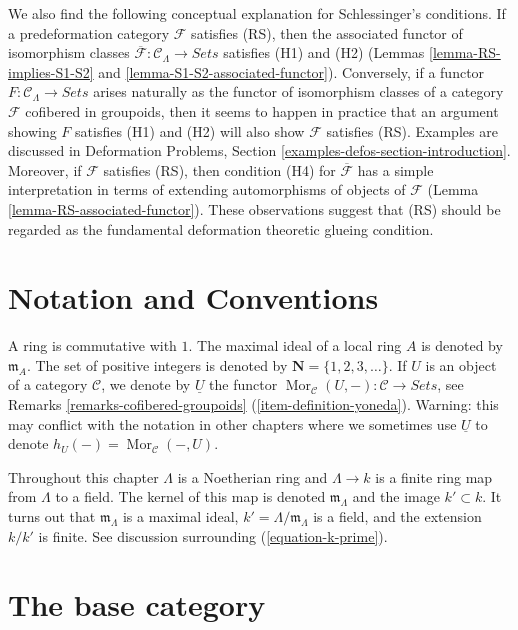 \documentclass{stacks-project}
\theoremstyle{plain}
\theoremstyle{definition}
\theoremstyle{remark}
\numberwithin{equation}{subsection}
\def\Mor{\mathop{\mathrm{Mor}}\nolimits}
\begin{document}
\medskip\noindent
We also find the following conceptual explanation for Schlessinger's
conditions. If a predeformation category $\mathcal{F}$ satisfies (RS),
then the associated functor of isomorphism classes
$\overline{\mathcal{F}}: \mathcal{C}_\Lambda \to \textit{Sets}$
satisfies (H1) and (H2)
(Lemmas \ref{lemma-RS-implies-S1-S2} and
\ref{lemma-S1-S2-associated-functor}).
Conversely, if a functor
$F : \mathcal{C}_\Lambda \to \textit{Sets}$
arises naturally as the functor of isomorphism classes of
a category $\mathcal{F}$ cofibered in groupoids, then it seems to happen in
practice that an argument showing $F$ satisfies (H1) and (H2) will also show
$\mathcal{F}$ satisfies (RS). Examples are discussed in
Deformation Problems, Section
\ref{examples-defos-section-introduction}.
Moreover, if $\mathcal{F}$ satisfies (RS), then condition
(H4) for $\overline{\mathcal{F}}$ has a simple interpretation in terms of
extending automorphisms of objects of $\mathcal{F}$
(Lemma \ref{lemma-RS-associated-functor}).
These observations suggest that (RS) should be regarded as the
fundamental deformation theoretic glueing condition.




\section{Notation and Conventions}
\label{section-notations-conventions}

\noindent
A ring is commutative with $1$. The  maximal ideal of a local ring $A$
is denoted by $\mathfrak{m}_A$. The set of positive integers is denoted
by $\mathbf{N} = \{1, 2, 3, \ldots\}$. If $U$ is an object of a
category $\mathcal{C}$, we denote by $\underline{U}$
the functor
$\Mor_\mathcal{C}(U, -): \mathcal{C} \to \textit{Sets}$, see
Remarks \ref{remarks-cofibered-groupoids} (\ref{item-definition-yoneda}).
Warning: this may conflict with the notation in other chapters where we
sometimes use $\underline{U}$ to denote $h_U(-) = \Mor_\mathcal{C}(-, U)$.

\medskip\noindent
Throughout this chapter $\Lambda$ is a Noetherian ring and
$\Lambda \to k$ is a finite ring map from $\Lambda$ to a field.
The kernel of this map is denoted $\mathfrak m_\Lambda$ and the
image $k' \subset k$. It turns out that $\mathfrak m_\Lambda$ is
a maximal ideal, $k' = \Lambda/\mathfrak m_\Lambda$ is a field, and
the extension $k/k'$ is finite. See discussion surrounding
(\ref{equation-k-prime}).


\section{The base category}
\label{section-CLambda}
\end{document}
